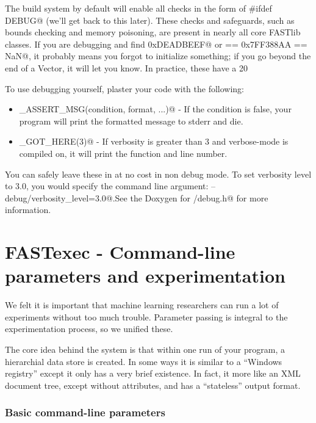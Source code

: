\documentclass[letter]{report}
\begin{document}
The build system by default will enable all checks in the form of \verb@#ifdef DEBUG@ (we'll get back to this later). These checks and safeguards, such as bounds checking and memory poisoning, are present in nearly all core FASTlib classes. If you are debugging and find \verb@0xDEADBEEF@ or  == 0x7FF388AA == NaN@, it probably means you forgot to initialize something; if you go beyond the end of a Vector, it will let you know. In practice, these have a 20%

To use debugging yourself, plaster your code with the following:
\begin{itemize}
\item \verb@DEBUG_ASSERT_MSG(condition, format, ...)@ - If the condition is false, your program will print the formatted message to stderr and die.
\item \verb@VERBOSE_GOT_HERE(3)@ - If verbosity is greater than 3 and verbose-mode is compiled on, it will print the function and line number. 
\end{itemize}
You can safely leave these in at no cost in non debug mode. To set verbosity level to 3.0, you would specify the command line argument: \verb@--debug/verbosity_level=3.0@.See the Doxygen for \verb@base/debug.h@ for more information.

\section{FASTexec - Command-line parameters and experimentation}

We felt it is important that machine learning researchers can run a lot of experiments without too much trouble. Parameter passing is integral to the experimentation process, so we unified these.

The core idea behind the system is that within one run of your program, a hierarchial data store is created. In some ways it is similar to a ``Windows registry'' except it only has a very brief existence. In fact, it more like an XML document tree, except without attributes, and has a ``stateless'' output format.

\subsubsection{Basic command-line parameters}
\end{document}
